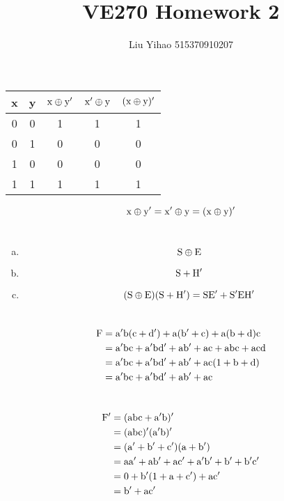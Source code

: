 \documentclass{article}
\title{VE270 Homework 2}
\author{Liu Yihao 515370910207}
\date{}
\begin{document}
\maketitle

\section{}
\begin{center}
\begin{tabular}{cc|ccc}
x&y&$\rm x\oplus y'$&$\rm x'\oplus y$&$\rm(x \oplus y)'$\\
\hline
0&0&1&1&1\\
0&1&0&0&0\\
1&0&0&0&0\\
1&1&1&1&1\\
\end{tabular}
\end{center}
$$\rm x\oplus y'=x'\oplus y=(x\oplus y)'$$

\section{}
\begin{enumerate}[(a)]
\item $$\rm S\oplus E$$
\item $$\rm S+H'$$
\item $$\rm (S\oplus E)(S+H')=SE'+S'EH'$$
\end{enumerate}

\section{}
\begin{align*}
\rm F&=\rm a'b(c+d')+a(b'+c)+a(b+d)c\\
&=\rm a'bc+a'bd'+ab'+ac+abc+acd\\
&=\rm a'bc+a'bd'+ab'+ac(1+b+d)\\
&=\rm a'bc+a'bd'+ab'+ac
\end{align*}

\section{}
\begin{align*}
\rm F'&=\rm (abc+a'b)'\\
&=\rm (abc)'(a'b)'\\
&=\rm (a'+b'+c')(a+b')\\
&=\rm aa'+ab'+ac'+a'b'+b'+b'c'\\
&=\rm 0+b'(1+a+c')+ac'\\
&=\rm b'+ac'
\end{align*}
\end{document}
